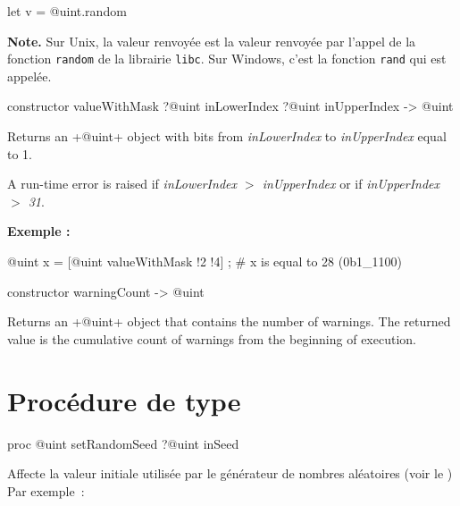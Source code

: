 \begin{galgas3}
  let v = @uint.random
\end{galgas3}


{\bf Note. } Sur Unix, la valeur renvoyée est la valeur renvoyée par l'appel de la fonction \texttt{random} de la librairie \texttt{libc}. Sur Windows, c'est la fonction \texttt{rand} qui est appelée.



\begin{galgas3}
constructor valueWithMask ?@uint inLowerIndex ?@uint inUpperIndex -> @uint
\end{galgas3}


Returns an \ggst+@uint+ object with bits from \emph{inLowerIndex} to \emph{inUpperIndex} equal to 1.

A run-time error is raised if \emph{inLowerIndex $>$ inUpperIndex} or if \emph{inUpperIndex $>$ 31}.



\textbf{Exemple :}
\begin{galgas3}
@uint x = [@uint valueWithMask !2 !4] ; # x is equal to 28 (0b1_1100)
\end{galgas3}





\begin{galgas3}
constructor warningCount -> @uint
\end{galgas3}


Returns an \ggst+@uint+ object that contains the number of warnings. The returned value is the cumulative count of warnings from the beginning of execution.





\section{Procédure de type}




\begin{galgas3box}
proc @uint setRandomSeed ?@uint inSeed
\end{galgas3box}

Affecte la valeur initiale utilisée par le générateur de nombres aléatoires (voir le ) Par exemple~:

\begin{galgas3}
\end{galgas3}






